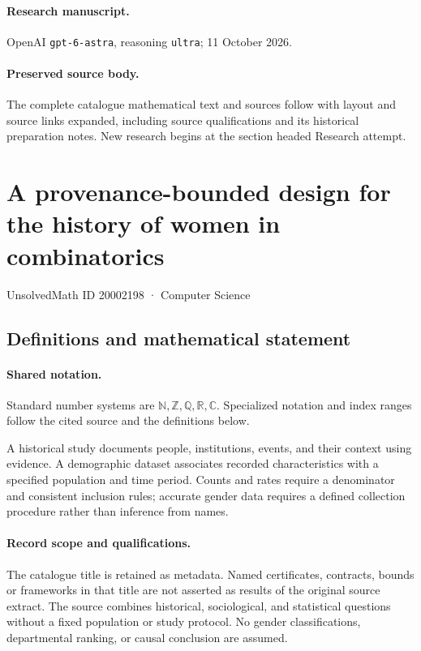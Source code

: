 \documentclass[11pt]{article}
\begin{document}
\paragraph{Research manuscript.} OpenAI \texttt{gpt-6-astra}, reasoning \texttt{ultra}; 11 October 2026.
\paragraph{Preserved source body.} The complete catalogue mathematical text and sources follow with layout and source links expanded, including source qualifications and its historical preparation notes. New research begins at the section headed Research attempt.

\section{A provenance-bounded design for the history of women in combinatorics}\label{20002198}
{\small UnsolvedMath ID 20002198 · Computer Science}
\subsection{Definitions and mathematical statement}

\paragraph{Shared notation.}Standard number systems are $\mathbb N,\mathbb Z,\mathbb Q,\mathbb R,\mathbb C$. Specialized notation and index ranges follow the cited source and the definitions below.


A historical study documents people, institutions, events, and their context using evidence. A demographic dataset associates recorded characteristics with a specified population and time period. Counts and rates require a denominator and consistent inclusion rules; accurate gender data requires a defined collection procedure rather than inference from names.
\paragraph{Record scope and qualifications.}
The catalogue title is retained as metadata. Named certificates, contracts, bounds or frameworks in that title are not asserted as results of the original source extract.
The source combines historical, sociological, and statistical questions without a fixed population or study protocol. No gender classifications, departmental ranking, or causal conclusion are assumed.
\end{document}
